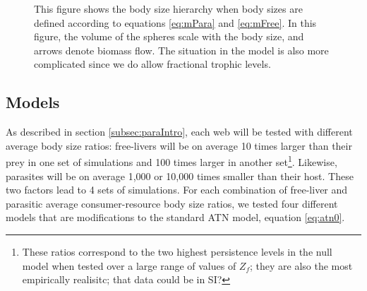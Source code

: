 \documentclass[11pt]{amsart}
\begin{document}
\begin{figure}
\caption{This figure shows the body size hierarchy when body sizes are defined according to equations \eqref{eq:mPara} and \eqref{eq:mFree}. In this figure, the volume of the spheres scale with the body size, and arrows denote biomass flow.  The situation in the model is also more complicated since we do allow fractional trophic levels.\label{fig:bsrCartoon}}
\end{figure}

\subsection{Models\label{subsec:models}}

As described in section \ref{subsec:paraIntro}, each web will be tested with different average body size ratios: free-livers will be on average 10 times larger than their prey in one set of simulations and 100 times larger in another set\footnote{These ratios correspond to the two highest persistence levels in the null model when tested over a large range of values of $Z_f$; they are also the most empirically realisitc; that data could be in SI?}.  Likewise, parasites will be on average 1,000 or 10,000 times smaller than their host.  These two factors lead to 4 sets of simulations.  For each combination of free-liver and parasitic average consumer-resource body size ratios, we tested four different models that are modifications to the standard ATN model, equation \eqref{eq:atn0}.
\end{document}
